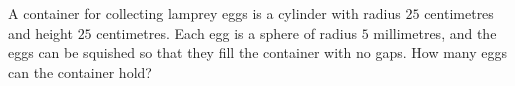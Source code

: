 A container for collecting lamprey eggs is a cylinder with radius $25$ centimetres and height $25$ centimetres. Each egg is a sphere of radius $5$ millimetres, and the eggs can be squished so that they fill the container with no gaps. How many eggs can the container hold?
